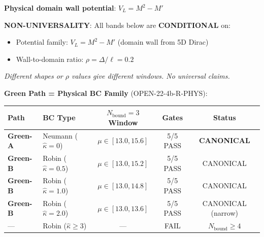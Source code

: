 
\begin{tcolorbox}[breakable, enhanced, colback=blue!5!white, colframe=blue!50!black,
    title=\textbf{Box 14.2: Physical $\mu$-Sweep Results --- Green Path Family}, width=\linewidth]
\label{box:ch14_physical_mu_sweep}

\textbf{Physical domain wall potential}: $V_L = M^2 - M'$ \tagDc{}

\textbf{NON-UNIVERSALITY}: All bands below are \textbf{CONDITIONAL} on:
\begin{itemize}[nosep]
    \item Potential family: $V_L = M^2 - M'$ (domain wall from 5D Dirac)
    \item Wall-to-domain ratio: $\rho = \Delta/\ell = 0.2$
\end{itemize}
\emph{Different shapes or $\rho$ values give different windows. No universal claims.}

\medskip
\textbf{Green Path = Physical BC Family} (OPEN-22-4b-R-PHYS):
\begin{center}
\renewcommand{\arraystretch}{1.3}
\begin{tabular}{llccc}
\toprule
\textbf{Path} & \textbf{BC Type} & \textbf{$N_{\text{bound}}=3$ Window} & \textbf{Gates} & \textbf{Status} \\
\midrule
\rowcolor{green!15}
\textbf{Green-A} & Neumann ($\hat\kappa = 0$) & $\mu \in [13.0, 15.6]$ & 5/5 PASS & \textbf{CANONICAL} \\
\rowcolor{green!10}
\textbf{Green-B} & Robin ($\hat\kappa = 0.5$) & $\mu \in [13.0, 15.2]$ & 5/5 PASS & CANONICAL \\
\rowcolor{green!10}
\textbf{Green-B} & Robin ($\hat\kappa = 1.0$) & $\mu \in [13.0, 14.8]$ & 5/5 PASS & CANONICAL \\
\rowcolor{green!10}
\textbf{Green-B} & Robin ($\hat\kappa = 2.0$) & $\mu \in [13.0, 13.6]$ & 5/5 PASS & CANONICAL (narrow) \\
\rowcolor{red!10}
--- & Robin ($\hat\kappa \geq 3$) & --- & FAIL & $N_{\text{bound}} \geq 4$ \\
\bottomrule
\end{tabular}
\end{center}


\end{tcolorbox}
